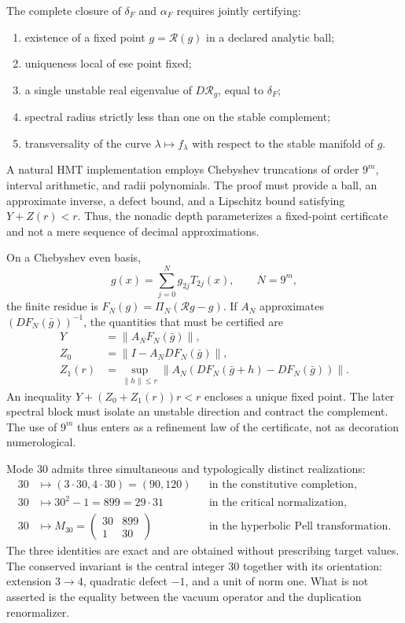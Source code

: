 The complete closure of \(\delta_F\) and \(\alpha_F\) requires jointly certifying:

\begin{enumerate}
\item existence of a fixed point \(g=\mathcal R(g)\) in a declared analytic ball;
\item uniqueness local of ese point fixed;
\item a single unstable real eigenvalue of \(D\mathcal R_g\), equal to \(\delta_F\);
\item spectral radius strictly less than one on the stable complement;
\item transversality of the curve \(\lambda\mapsto f_\lambda\) with respect to the stable manifold of \(g\).
\end{enumerate}

A natural HMT implementation employs Chebyshev truncations of order
\(9^m\), interval arithmetic, and radii polynomials. The proof must
provide a ball, an approximate inverse, a defect bound, and a
Lipschitz bound satisfying \(Y+Z(r)<r\). Thus, the nonadic
depth parameterizes a fixed-point certificate and not a mere sequence
of decimal approximations.

On a Chebyshev even basis,
\[
g(x)=\sum_{j=0}^{N}g_{2j}T_{2j}(x),\qquad N=9^m,
\]
the finite residue is \(F_N(g)=\Pi_N(\mathcal Rg-g)\). If \(A_N\) approximates
\((DF_N(\bar g))^{-1}\), the quantities that must be certified are
\begin{align*}
Y&=\|A_NF_N(\bar g)\|,\\
Z_0&=\|I-A_NDF_N(\bar g)\|,\\
Z_1(r)&=\sup_{\|h\|\le r}
\|A_N(DF_N(\bar g+h)-DF_N(\bar g))\|.
\end{align*}
An inequality
\(Y+(Z_0+Z_1(r))r<r\) encloses a unique fixed point. The later spectral block
must isolate an unstable direction and contract the complement. The
use of \(9^m\) thus enters as a refinement law of the certificate, not as
decoration numerological.

\begin{corollary}
Mode \(30\) admits three simultaneous and typologically
distinct realizations:
\begin{align*}
30&\longmapsto(3\cdot30,4\cdot30)=(90,120)
&&\text{in the constitutive completion},\\
30&\longmapsto30^2-1=899=29\cdot31
&&\text{in the critical normalization},\\
30&\longmapsto
M_{30}=\begin{pmatrix}30&899\\1&30\end{pmatrix}
&&\text{in the hyperbolic Pell transformation}.
\end{align*}
The three identities are exact and are obtained without prescribing target values. The conserved invariant is the central integer \(30\) together with its orientation: extension \(3\to4\), quadratic defect \(-1\), and a unit of norm one. What is not asserted is the equality between the vacuum operator and the duplication renormalizer.
\end{corollary}

